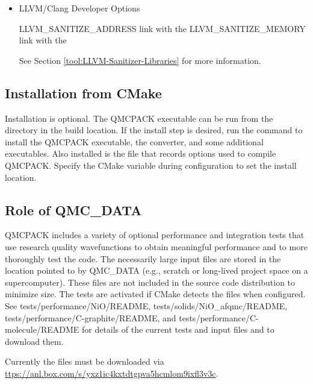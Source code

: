 \begin{itemize}
\item LLVM/Clang Developer Options\\
\begin{shade}
LLVM_SANITIZE_ADDRESS     link with the %
LLVM_SANITIZE_MEMORY      link with the %
\end{shade}

See Section \ref{tool:LLVM-Sanitizer-Libraries} for more information.
\end{itemize}

\subsection{Installation from CMake}
Installation is optional. The QMCPACK executable can be run from the  directory in the build location.
If the install step is desired, run the  command to install the QMCPACK executable, the converter,
and some additional executables.
Also installed is the  file that records options used to compile QMCPACK.
Specify the  CMake variable during configuration to set the install location.


\subsection{Role of QMC\_DATA}
QMCPACK includes a variety of optional performance and integration
tests that use research quality wavefunctions to obtain meaningful
performance and to more thoroughly test the code. The necessarily
large input files are stored in the location pointed to by QMC\_DATA (e.g., scratch or long-lived project space on a supercomputer). These
files are not included in the source code distribution to minimize
size. The tests are activated if CMake detects the files when
configured. See tests/performance/NiO/README,
tests/solids/NiO\_afqmc/README, tests/performance/C-graphite/README, and tests/performance/C-molecule/README
for details of the current tests and input files and to download them.

Currently the files must be downloaded via
\url{ttps://anl.box.com/s/yxz1ic4kxtdtgpva5hcmlom9ixfl3v3c}.


